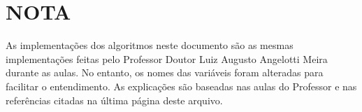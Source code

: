 \section{\textbf{NOTA}}

As implementações dos algoritmos neste documento são as mesmas implementações feitas pelo Professor Doutor Luiz Augusto Angelotti Meira durante as aulas. No entanto,
os nomes das variáveis foram alteradas para facilitar o entendimento. As explicações são baseadas nas aulas do Professor e nas referências citadas na última página deste arquivo.
